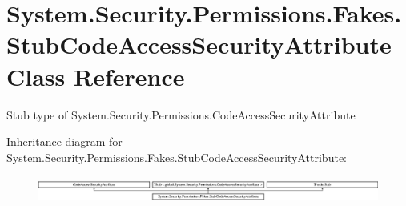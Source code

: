 \hypertarget{class_system_1_1_security_1_1_permissions_1_1_fakes_1_1_stub_code_access_security_attribute}{\section{System.\-Security.\-Permissions.\-Fakes.\-Stub\-Code\-Access\-Security\-Attribute Class Reference}
\label{class_system_1_1_security_1_1_permissions_1_1_fakes_1_1_stub_code_access_security_attribute}
}


Stub type of System.\-Security.\-Permissions.\-Code\-Access\-Security\-Attribute 


Inheritance diagram for System.\-Security.\-Permissions.\-Fakes.\-Stub\-Code\-Access\-Security\-Attribute\-:\begin{figure}[H]
\begin{center}
\leavevmode
\includegraphics[height=0.844646cm]{class_system_1_1_security_1_1_permissions_1_1_fakes_1_1_stub_code_access_security_attribute}
\end{center}
\end{figure}
